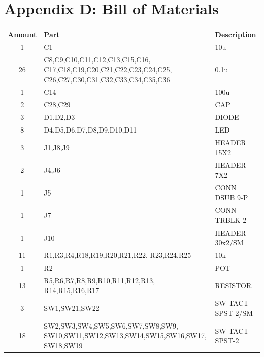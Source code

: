         \clearpage
        \newpage

    \section{Appendix D: Bill of Materials} \label{appendix:bom}

        \def\arraystretch{1.22}
        \begin{table}[H]
            \footnotesize
            \begin{tabular*}{100pt}{@{\extracolsep{\fill}} c p{10cm} p{10cm}}
                \textbf{Amount} & \textbf{Part} & \textbf{Description} \\
                1 & C1 & 10u \\
                26 & C8,C9,C10,C11,C12,C13,C15,C16,\newline
                C17,C18,C19,C20,C21,C22,C23,C24,C25,\newline 
                C26,C27,C30,C31,C32,C33,C34,C35,C36 & 0.1u \\
                1 & C14 & 100u \\
                2 & C28,C29 & CAP \\
                3 & D1,D2,D3 & DIODE \\
                8 & D4,D5,D6,D7,D8,D9,D10,D11 & LED \\
                3 & J1,J8,J9 & HEADER 15X2 \\
                2 & J4,J6 & HEADER 7X2 \\
                1 & J5 & CONN DSUB 9-P \\
                1 & J7 & CONN TRBLK 2 \\
                1 & J10 & HEADER 30x2/SM \\
                11 & R1,R3,R4,R18,R19,R20,R21,R22,\newline
                R23,R24,R25 & 10k \\
                1 & R2 & POT \\
                13 & R5,R6,R7,R8,R9,R10,R11,R12,R13,\newline
                R14,R15,R16,R17 & RESISTOR \\
                3 & SW1,SW21,SW22 & SW TACT-SPST-2/SM \\
                18 & SW2,SW3,SW4,SW5,SW6,SW7,SW8,SW9,\newline
                SW10,SW11,SW12,SW13,SW14,SW15,SW16,SW17,\newline
                SW18,SW19 & SW TACT-SPST-2 \\

\end{tabular*}
\end{table}
